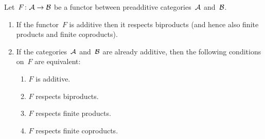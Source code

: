 \begin{theorem}
  Let~$F \colon \mathcal{A} \to \mathcal{B}$ be a functor between preadditive categories~$\mathcal{A}$ and~$\mathcal{B}$.
  \begin{enumerate}
    \item
      \label{additive preserves biproducts}
      If the functor~$F$ is additive then it respects biproducts (and hence also finite products and finite coproducts).
    \item
      If the categories~$\mathcal{A}$ and~$\mathcal{B}$ are already additive, then the following conditions on~$F$ are equivalent:
      \begin{enumerate}
        \item
          \label{is additive}
          $F$ is additive.
        \item
          \label{respects biproducts}
          $F$ respects biproducts.
        \item
          \label{respects finite products}
          $F$ respects finite products.
        \item
          \label{respects finite coproducts}
          $F$ respects finite coproducts.
      \end{enumerate}
  \end{enumerate}
\end{theorem}


